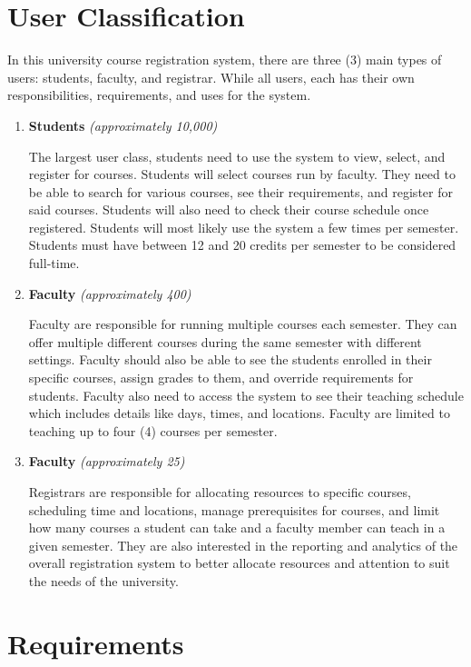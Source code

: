 \section{User Classification}
In this university course registration system, there are three (3) main types of users: students, faculty, and registrar. While all users, each has their own responsibilities, requirements, and uses for the system. 
\begin{enumerate}
    \item{\textbf{Students} \textit{(approximately 10,000)}}
    
    The largest user class, students need to use the system to view, select, and register for courses. Students will select courses run by faculty. They need to be able to search for various courses, see their requirements, and register for said courses. Students will also need to check their course schedule once registered. Students will most likely use the system a few times per semester. Students must have between 12 and 20 credits per semester to be considered full-time.
    
    \item{\textbf{Faculty} \textit{(approximately 400)}}

    Faculty are responsible for running multiple courses each semester. They can offer multiple different courses during the same semester with different settings. Faculty should also be able to see the students enrolled in their specific courses, assign grades to them, and override requirements for students. Faculty also need to access the system to see their teaching schedule which includes details like days, times, and locations. Faculty are limited to teaching up to four (4) courses per semester.
    
    \item{\textbf{Faculty} \textit{(approximately 25)}}

    Registrars are responsible for allocating resources to specific courses, scheduling time and locations, manage prerequisites for courses, and limit how many courses a student can take and a faculty member can teach in a given semester. They are also interested in the \gls{reporting} and analytics of the overall registration system to better \gls{allocate} resources and attention to suit the needs of the university.
    
\end{enumerate}

\section{Requirements}

